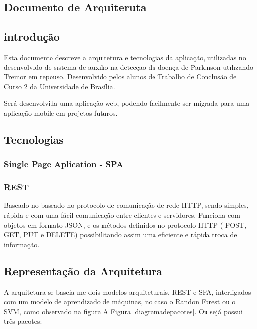 \begin{anexosenv}

	\partanexos

	\chapter{Documento de Arquiteruta}
	\section{introdução}
	Esta documento descreve a arquitetura e tecnologias da aplicação, utilizadas no desenvolvido do sistema de auxilio na detecção da doença de Parkinson utilizando Tremor em repouso. Desenvolvido pelos alunos de Trabalho de Conclusão de Curso 2 da Universidade de Brasília.

	Será desenvolvida uma aplicação web, podendo facilmente ser migrada para uma aplicação mobile em projetos futuros.

	\section{Tecnologias}
	\subsection{Single Page Aplication - SPA}

	\subsection{REST}
	Baseado no baseado no protocolo de comunicação de rede HTTP, sendo simples, rápida e com uma fácil comunicação entre clientes e servidores. Funciona com objetos em formato JSON, e os métodos definidos no protocolo HTTP ( POST, GET, PUT e DELETE) possibilitando assim uma eficiente e rápida troca de informação.

	\section{Representação da Arquitetura}
	A arquitetura se baseia me dois modelos arquiteturais, REST e SPA, interligados com um modelo de aprendizado de máquinas, no caso o Randon Forest ou o SVM, como observado na figura A Figura \ref{diagramadepacotes}. Ou sejá possui três pacotes:


\end{anexosenv}
